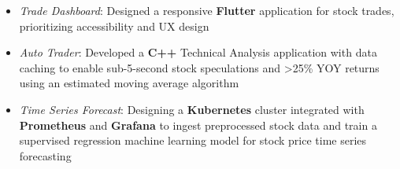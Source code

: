 \begin{itemize}
  \item \textit{Trade Dashboard}: Designed a responsive \textbf{Flutter} application for stock trades, prioritizing accessibility and UX design
  \item \textit{Auto Trader}: Developed a \textbf{C++} Technical Analysis application with data caching to enable sub-5-second stock speculations and \textgreater{}25\% YOY returns using an estimated moving average algorithm
  \item \textit{Time Series Forecast}: Designing a \textbf{Kubernetes} cluster integrated with \textbf{Prometheus} and \textbf{Grafana} to ingest preprocessed stock data and train a supervised regression machine learning model for stock price time series forecasting
\end{itemize}